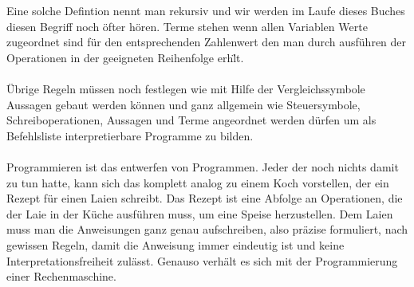 \documentclass[11pt,a4paper,leqno]{report}
\numberwithin{equation}{chapter}
\begin{document}
Eine solche Defintion nennt man rekursiv und wir werden im Laufe dieses Buches diesen Begriff noch \"ofter h\"oren.
Terme stehen wenn allen Variablen Werte zugeordnet sind f\"ur den entsprechenden Zahlenwert den man durch ausf\"uhren der Operationen in der geeigneten Reihenfolge erh\"lt.\\
\\
\"Ubrige Regeln m\"ussen noch festlegen wie mit Hilfe der Vergleichssymbole Aussagen gebaut werden k\"onnen und ganz allgemein wie Steuersymbole, Schreiboperationen, Aussagen und Terme angeordnet werden d\"urfen um als Befehlsliste interpretierbare Programme zu bilden.\\
\\
Programmieren ist das entwerfen von Programmen. Jeder der noch nichts damit zu tun hatte, kann sich das komplett analog zu einem Koch vorstellen, der ein Rezept f\"ur einen Laien schreibt. Das Rezept ist eine Abfolge an Operationen, die der Laie in der K\"uche ausf\"uhren muss, um eine Speise herzustellen. Dem Laien muss man die Anweisungen ganz genau aufschreiben, also pr\"azise formuliert, nach gewissen Regeln, damit die Anweisung immer eindeutig ist und keine Interpretationsfreiheit zul\"asst. Genauso verh\"alt es sich mit der Programmierung einer Rechenmaschine.
\end{document}
